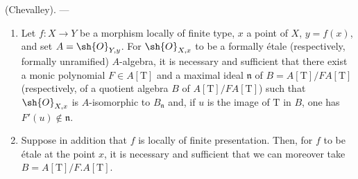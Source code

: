 \begin{theorem}[18.4.6]
\label{IV.18.4.6}
(Chevalley). ---
\begin{enumerate}
  \item[(i)] Let $f:X\to Y$ be a morphism locally of finite type, $x$ a point of $X$, $y=f(x)$, and set $A=\sh{O}_{Y,y}$.
For $\sh{O}_{X,x}$ to be a formally \'etale (respectively, formally unramified) $A$-algebra, it is necessary and sufficient that there exist a monic polynomial $F\in A[\mathrm{T}]$ and a maximal ideal $\mathfrak{n}$ of $B=A[\mathrm{T}]/F A[\mathrm{T}]$ (respectively, of a quotient algebra $B$ of $A[\mathrm{T}]/F A[\mathrm{T}]$) such that $\sh{O}_{X,x}$ is $A$-isomorphic to $B_\mathfrak{n}$ and, if $u$ is the image of $\mathrm{T}$ in $B$, one has $F'(u)\notin\mathfrak{n}$.
  \item[(ii)] Suppose in addition that $f$ is locally of finite presentation.
Then, for $f$ to be \'etale at the point $x$, it is necessary and sufficient that we can moreover take $B=A[\mathrm{T}]/F.A[\mathrm{T}]$.
\end{enumerate}
\end{theorem}


